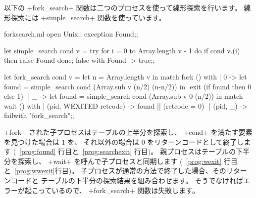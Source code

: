 \begin{example}
\label{ex/forksearch}
以下の \ml+fork_search+ 関数は二つのプロセスを使って線形探索を行います。
線形探索には \ml+simple_search+ 関数を使っています。
%
\begin{listingcodefile}[style=numbers]{forksearch.ml}
open Unix;;
exception Found;;

let simple_search cond v =
 try
   for i = 0 to Array.length v - 1 do
     if cond v.(i) then raise Found
   done;
   false
 with Found -> true;;

let fork_search cond v =
 let n = Array.length v in
 match fork () with
 | 0 ->
     let found = simple_search cond (Array.sub v (n/2) (n-n/2)) in $\label{prog:found}$
     exit (if found then 0 else 1) $\label{prog:searchexit}$
 | _ ->
     let found = simple_search cond (Array.sub v 0 (n/2)) in
     match wait () with
     | (pid, WEXITED retcode) -> found || (retcode = 0) $\label{prog:wexit}$
     | (pid, _)               -> failwith "fork_search";;$\label{prog:wwexit}$
\end{listingcodefile}
%
\ml+fork+ された子プロセスはテーブルの上半分を探索し、 \ml+cond+ を満たす要素を見つけた場合は $1$ を、
それ以外の場合は $0$ をリターンコードとして終了します (~\ref{prog:found} 行目と~\ref{prog:searchexit} 行目)。
親プロセスはテーブルの下半分を探索し、 \ml+wait+ を呼んで子プロセスと同期します (~\ref{prog:wexit} 行目
と~\ref{prog:wwexit}行目)。 子プロセスが通常の方法で終了した場合、そのリターンコードと
テーブルの下半分の探索結果を組み合わせます。
そうでなければエラーが起こっているので、 \ml+fork_search+ 関数は失敗します。
\end{example}

